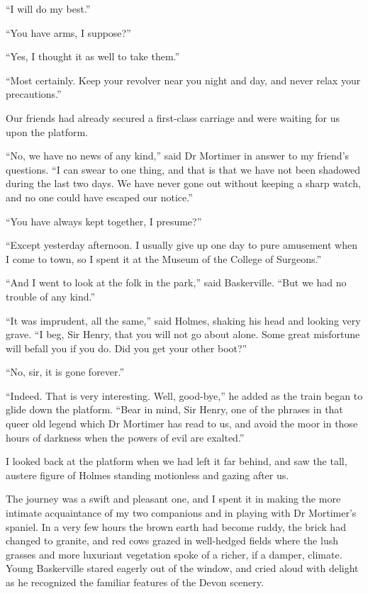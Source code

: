 \documentclass[paper=5.5in:8.5in,BCOR=7mm,twoside,DIV=calc,12pt,usegeometry,openany,chapterprefix,endperiod]{scrbook} %
\begin{document}
\enquote{I will do my best.}

\enquote{You have arms, I suppose?}

\enquote{Yes, I thought it as well to take them.}

\enquote{Most certainly. Keep your revolver near you night and day, and never relax your precautions.}

Our friends had already secured a first-class carriage and were waiting for us upon the platform.

\enquote{No, we have no news of any kind,} said Dr Mortimer in answer to my friend's questions. \enquote{I can swear to one thing, and that is that we have not been shadowed during the last two days. We have never gone out without keeping a sharp watch, and no one could have escaped our notice.}

\enquote{You have always kept together, I presume?}

\enquote{Except yesterday afternoon. I usually give up one day to pure amusement when I come to town, so I spent it at the Museum of the College of Surgeons.}

\enquote{And I went to look at the folk in the park,} said Baskerville. \enquote{But we had no trouble of any kind.}

\enquote{It was imprudent, all the same,} said Holmes, shaking his head and looking very grave. \enquote{I beg, Sir Henry, that you will not go about alone. Some great misfortune will befall you if you do. Did you get your other boot?}

\enquote{No, sir, it is gone forever.}

\enquote{Indeed. That is very interesting. Well, good-bye,} he added as the train began to glide down the platform. \enquote{Bear in mind, Sir Henry, one of the phrases in that queer old legend which Dr Mortimer has read to us, and avoid the moor in those hours of darkness when the powers of evil are exalted.}

I looked back at the platform when we had left it far behind, and saw the tall, austere figure of Holmes standing motionless and gazing after us.

The journey was a swift and pleasant one, and I spent it in making the more intimate acquaintance of my two companions and in playing with Dr Mortimer's spaniel. In a very few hours the brown earth had become ruddy, the brick had changed to granite, and red cows grazed in well-hedged fields where the lush grasses and more luxuriant vegetation spoke of a richer, if a damper, climate. Young Baskerville stared eagerly out of the window, and cried aloud with delight as he recognized the familiar features of the Devon scenery.
\end{document}
